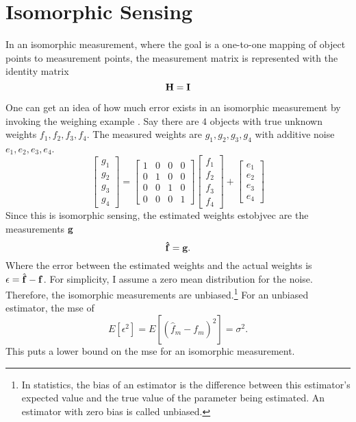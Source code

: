 \section{Isomorphic Sensing}


In an isomorphic measurement, where the goal is a one-to-one mapping of object points to measurement points, the measurement matrix is represented with the identity matrix
\begin{equation}
	\displaystyle \mathbf{H}=\displaystyle \mathbf{I}	
\end{equation}


One can get an idea of how much error exists in an isomorphic measurement by invoking the weighing example \cite{harwit2012hadamard}. Say there are $4$ objects with true unknown weights $f_{1}, f_{2}, f_{3}, f_{4}$. The measured weights are $g_{1}, g_{2}, g_{3}, g_{4}$ with additive noise  $ e_1, e_2, e_3, e_4 $. 
%
%
\begin{equation}
	\left[ \begin{matrix} g_1\\ g_2\\ g_3\\ g_4\end{matrix} \right] = \left[ \begin{matrix} 1& 0& 0& 0\\ 0& 1& 0& 0\\ 0& 0& 1& 0\\ 0& 0& 0& 1\end{matrix} \right] \left[ \begin{matrix} f_1\\ f_2\\ f_3\\ f_4\end{matrix} \right] + \left[ \begin{matrix} e_1\\ e_2\\ e_3\\ e_4\end{matrix} \right] 
	\label{eq:gHfpluse}
\end{equation}
%
%
Since this is \gls{isomorphic sensing}, the estimated weights \gls{estobjvec} are the measurements  $ \displaystyle \mathbf{g} $
%
%
\begin{equation}
	\displaystyle \mathbf{ \hat{ f }} = \displaystyle \mathbf{g}. 
\end{equation}
%
%
Where the error between the estimated weights and the actual weights is $ \displaystyle \mathbf{\epsilon} = \hat{ \displaystyle \mathbf{f} } - \displaystyle \mathbf{f} $. For simplicity, I assume a zero mean distribution for the noise. Therefore, the isomorphic measurements are unbiased.\footnote{In statistics, the bias of an estimator is the difference between this estimator's expected value and the true value of the parameter being estimated. An estimator with zero bias is called unbiased.} For an unbiased estimator, the \gls{mse} of 
%
%
\begin{equation}
	E [  \epsilon^2 ] = E [ ( \hat{f}_m - f_m )^2 ] = \sigma^2.
\end{equation}
%
%
This puts a lower bound on the \gls{mse} for an isomorphic measurement. 



